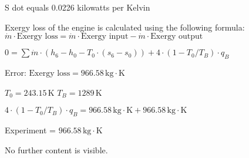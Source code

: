S dot equals 0.0226 kilowatts per Kelvin

Exergy loss of the engine is calculated using the following formula:  
\( \dot{m} \cdot \text{Exergy loss} = \dot{m} \cdot \text{Exergy input} - \dot{m} \cdot \text{Exergy output} \)  

\( 0 = \sum \dot{m} \cdot \left( h_6 - h_0 - T_0 \cdot (s_6 - s_0) \right) + 4 \cdot (1 - T_0 / T_B) \cdot q_B \)  

Error:  
\( \text{Exergy loss} = 966.58 \, \text{kg} \cdot \text{K} \)  

\( T_0 = 243.15 \, \text{K} \)  
\( T_B = 1289 \, \text{K} \)  

\( 4 \cdot (1 - T_0 / T_B) \cdot q_B = 966.58 \, \text{kg} \cdot \text{K} + 966.58 \, \text{kg} \cdot \text{K} \)  

Experiment = \( 966.58 \, \text{kg} \cdot \text{K} \)  

No further content is visible.